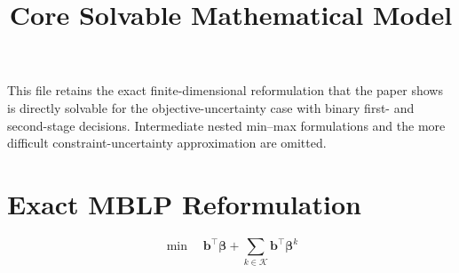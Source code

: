 \documentclass{article}
\title{Core Solvable Mathematical Model}
\author{}
\date{}
\begin{document}
\maketitle

This file retains the exact finite-dimensional reformulation that the paper shows is directly solvable for the objective-uncertainty case with binary first- and second-stage decisions. Intermediate nested min--max formulations and the more difficult constraint-uncertainty approximation are omitted.

\section{Exact MBLP Reformulation}

\begin{equation}
\min \quad \boldsymbol{b}^{\top}\boldsymbol{\beta} + \sum_{k\in\mathcal{K}} \boldsymbol{b}^{\top}\boldsymbol{\beta}^k
\tag{EC.12}
\end{equation}
\end{document}
